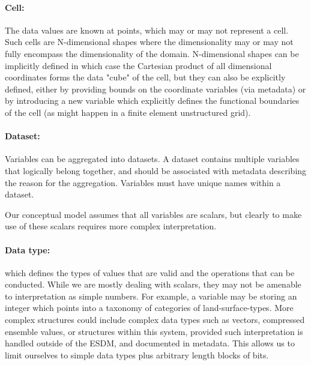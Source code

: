\paragraph{Cell:} The data values are known at points, which may or may not represent a cell. Such cells are N-dimensional shapes where the dimensionality may or may not fully encompass the dimensionality of the domain.
N-dimensional shapes can be implicitly defined in which case the Cartesian product of all dimensional coordinates forms the data "cube" of the cell, but they can also be explicitly defined, either by providing bounds on the coordinate variables (via metadata) or by introducing a new variable which explicitly defines the functional boundaries of the cell (as might happen in a finite element unstructured grid).


\paragraph{Dataset:} Variables can be aggregated into datasets. A dataset contains multiple variables that logically belong together, and should be associated with metadata describing the reason for the aggregation.  Variables must have unique names within a dataset.



Our conceptual model assumes that all variables are scalars, but clearly to make use of these scalars requires more complex interpretation.

\paragraph{Data type:}
which defines the types of values that are valid and the operations that can be conducted.
While we are mostly dealing with scalars, they may not be amenable to interpretation as simple numbers.
For example, a variable may be storing an integer which points into a taxonomy of categories of land-surface-types.
More complex structures could include complex data types such as vectors, compressed ensemble values, or structures within this system, provided such interpretation is handled outside of the ESDM, and documented in metadata.  This allows us to limit ourselves to simple data types plus arbitrary length blocks of bits.

